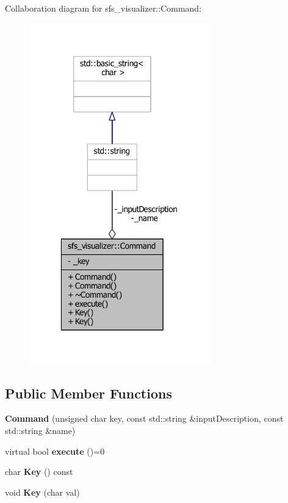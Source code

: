 Collaboration diagram for sfs\-\_\-visualizer\-:\-:Command\-:\nopagebreak
\begin{figure}[H]
\begin{center}
\leavevmode
\includegraphics[width=223pt]{d9/dc6/classsfs__visualizer_1_1Command__coll__graph}
\end{center}
\end{figure}
\subsection*{Public Member Functions}
\begin{DoxyCompactItemize}
\item 
{\bfseries Command} (unsigned char key, const std\-::string \&input\-Description, const std\-::string \&name)\label{classsfs__visualizer_1_1Command_ae2614111a870d6f6cc5aaecdd78db126}

\item 
virtual bool {\bfseries execute} ()=0\label{classsfs__visualizer_1_1Command_a5d2f2897ed6d2a517034cc9f39573473}

\item 
char {\bfseries Key} () const \label{classsfs__visualizer_1_1Command_a536fba3a4a60b98a3fbe4f9f408a704c}

\item 
void {\bfseries Key} (char val)\label{classsfs__visualizer_1_1Command_a6783c6e3be00bafa41a4fd8c5e2afcfe}

\end{DoxyCompactItemize}
